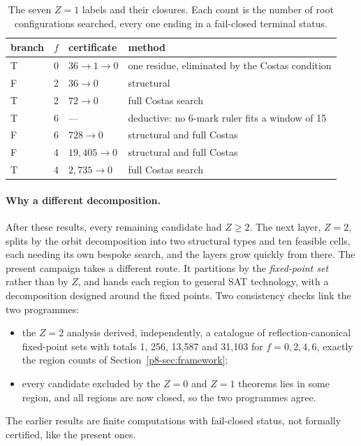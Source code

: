 \documentclass[11pt,a4paper,oneside]{report}
\theoremstyle{definition}
\begin{document}
\begin{table}[H]
\centering
\begin{tabular}{@{}llll@{}}
\toprule
branch & $f$ & certificate & method \\
\midrule
T & 0 & $36\to1\to0$ & one residue, eliminated by the Costas condition \\
F & 2 & $36\to0$ & structural \\
T & 2 & $72\to0$ & full Costas search \\
T & 6 & --- & deductive: no 6-mark ruler fits a window of 15 \\
F & 6 & $728\to0$ & structural and full Costas \\
F & 4 & $19{,}405\to0$ & structural and full Costas \\
T & 4 & $2{,}735\to0$ & full Costas search \\
\bottomrule
\end{tabular}
\caption{The seven $Z=1$ labels and their closures. Each count is the number of root
configurations searched, every one ending in a fail-closed terminal status.}
\label{p8-tab:z1}
\end{table}

\paragraph{Why a different decomposition.} After these results, every remaining candidate
had $Z\ge2$. The next layer, $Z=2$, splits by the orbit decomposition into two structural
types and ten feasible cells, each needing its own bespoke search, and the layers grow
quickly from there. The present campaign takes a different route. It partitions by the
\emph{fixed-point set} rather than by $Z$, and hands each region to general SAT
technology, with a decomposition designed around the fixed points. Two consistency checks link
the two programmes:
\begin{itemize}
\item the $Z=2$ analysis derived, independently, a catalogue of reflection-canonical
fixed-point sets with totals 1, 256, 13{,}587 and 31{,}103 for $f=0,2,4,6$, exactly the region
counts of Section~\ref{p8-sec:framework};
\item every candidate excluded by the $Z=0$ and $Z=1$ theorems lies in some region, and all
regions are now closed, so the two programmes agree.
\end{itemize}
The earlier results are finite computations with fail-closed status, not formally certified,
like the present ones.
\end{document}
